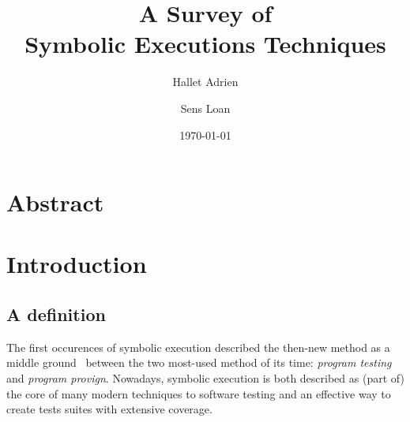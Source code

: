 \documentclass[11pt]{IEEEtran}
\begin{document}
\title{A Survey of\\Symbolic Executions Techniques} %
\author{Hallet Adrien \and Sens Loan}
\date{\today}
\maketitle

  \section*{Abstract}

  \section{Introduction}
    \subsection{A definition}
      The first occurences of symbolic execution described the then-new method as a middle ground~\cite{newapproach} between the two most-used method of its time: \emph{program testing} and \emph{program provign}.
      Nowadays, symbolic execution is both described as (part of) the core of many modern techniques to software testing\cite{chopper:icse18} and an effective way to create tests suites with extensive coverage.\cite{threedecadeslater}
\end{document}
